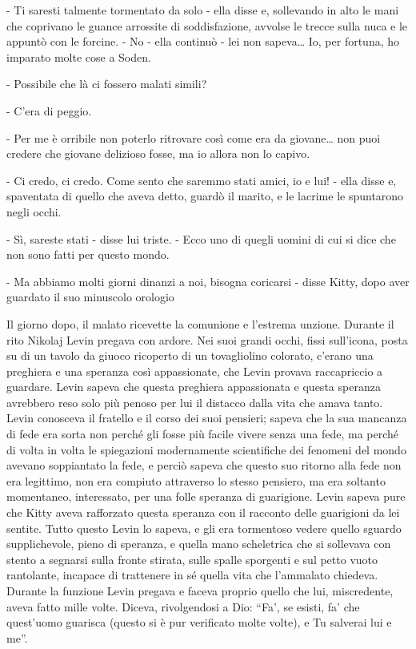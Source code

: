 - Ti saresti talmente tormentato da solo - ella disse e, sollevando in alto le mani che coprivano le guance arrossite di soddisfazione, avvolse le trecce sulla nuca e le appuntò con le forcine. - No - ella continuò - lei non sapeva\ldots{} Io, per fortuna, ho imparato molte cose a Soden. 

- Possibile che là ci fossero malati simili? 

- C'era di peggio. 

- Per me è orribile non poterlo ritrovare così come era da giovane\ldots{} non puoi credere che giovane delizioso fosse, ma io allora non lo capivo. 

- Ci credo, ci credo. Come sento che saremmo stati amici, io e lui! - ella disse e, spaventata di quello che aveva detto, guardò il marito, e le lacrime le spuntarono negli occhi. 

- Sì, sareste stati - disse lui triste. - Ecco uno di quegli uomini di cui si dice che non sono fatti per questo mondo. 

- Ma abbiamo molti giorni dinanzi a noi, bisogna coricarsi - disse Kitty, dopo aver guardato il suo minuscolo orologio 

Il giorno dopo, il malato ricevette la comunione e l'estrema unzione. Durante il rito Nikolaj Levin pregava con ardore. Nei suoi grandi occhi, fissi sull'icona, posta su di un tavolo da giuoco ricoperto di un tovagliolino colorato, c'erano una preghiera e una speranza così appassionate, che Levin provava raccapriccio a guardare. Levin sapeva che questa preghiera appassionata e questa speranza avrebbero reso solo più penoso per lui il distacco dalla vita che amava tanto. Levin conosceva il fratello e il corso dei suoi pensieri; sapeva che la sua mancanza di fede era sorta non perché gli fosse più facile vivere senza una fede, ma perché di volta in volta le spiegazioni modernamente scientifiche dei fenomeni del mondo avevano soppiantato la fede, e perciò sapeva che questo suo ritorno alla fede non era legittimo, non era compiuto attraverso lo stesso pensiero, ma era soltanto momentaneo, interessato, per una folle speranza di guarigione. Levin sapeva pure che Kitty aveva rafforzato questa speranza con il racconto delle guarigioni da lei sentite. Tutto questo Levin lo sapeva, e gli era tormentoso vedere quello sguardo supplichevole, pieno di speranza, e quella mano scheletrica che si sollevava con stento a segnarsi sulla fronte stirata, sulle spalle sporgenti e sul petto vuoto rantolante, incapace di trattenere in sé quella vita che l'ammalato chiedeva. Durante la funzione Levin pregava e faceva proprio quello che lui, miscredente, aveva fatto mille volte. Diceva, rivolgendosi a Dio: ``Fa', se esisti, fa' che quest'uomo guarisca (questo si è pur verificato molte volte), e Tu salverai lui e me''. 

